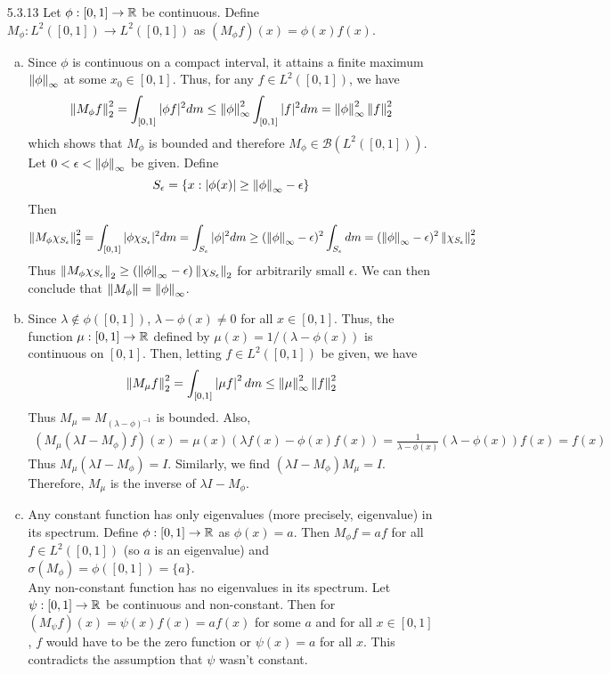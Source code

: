 \documentclass[../../Solutions.tex]{subfiles}
\begin{document}
\begin{itemize}
	\item [5.3.13] Let $\phi:[0,1]\to\mathbb{R}$ be continuous.
		Define $M_\phi:L^2([0,1])\to L^2([0,1])$ as $(M_\phi f)(x) = \phi(x)f(x)$.
		\begin{enumerate}[(a)]
			\item Since $\phi$ is continuous on a compact interval, it attains a finite maximum $\left\lVert\phi\right\rVert_\infty$ at some $x_0 \in [0,1]$.
				Thus, for any $f \in L^2([0,1])$, we have
				$$ \left\lVert M_\phi f\right\rVert_2^2 = \int_{[0,1]} |\phi f|^2 dm \leq \left\lVert\phi\right\rVert_\infty^2 \int_{[0,1]} |f|^2 dm = \left\lVert\phi\right\rVert_\infty^2 \left\lVert f\right\rVert_2^2 $$
				which shows that $M_\phi$ is bounded and therefore $M_\phi \in \mathcal{B}\left(L^2([0,1])\right)$.
				Let $0 < \epsilon < \left\lVert\phi\right\rVert_\infty$ be given.
				Define
				$$ S_\epsilon = \{x : |\phi(x)| \geq \left\lVert\phi\right\rVert_\infty-\epsilon\} $$
				Then
				$$ \left\lVert M_\phi \chi_{S_\epsilon}\right\rVert_2^2 = \int_{[0,1]} |\phi \chi_{S_\epsilon}|^2 dm = \int_{S_\epsilon} |\phi|^2 dm \geq (\left\lVert\phi\right\rVert_\infty - \epsilon)^2 \int_{S_\epsilon} dm = (\left\lVert\phi\right\rVert_\infty - \epsilon)^2 \left\lVert\chi_{S_\epsilon}\right\rVert_2^2 $$
				Thus $\left\lVert M_\phi \chi_{S_\epsilon}\right\rVert_2 \geq (\left\lVert\phi\right\rVert_\infty - \epsilon)\left\lVert\chi_{S_\epsilon}\right\rVert_2$ for arbitrarily small $\epsilon$.
				We can then conclude that $\left\lVert M_\phi\right\rVert = \left\lVert\phi\right\rVert_\infty$.
			\item Since $\lambda \not\in \phi([0,1])$, $\lambda-\phi(x) \neq 0$ for all $x \in [0,1]$.
				Thus, the function $\mu:[0,1]\to\mathbb{R}$ defined by $\mu(x) = 1/(\lambda-\phi(x))$ is continuous on $[0,1]$.
				Then, letting $f \in L^2([0,1])$ be given, we have
				\begin{align*}
					\left\lVert M_\mu f\right\rVert_2^2 = \int_{[0,1]} \left|\mu f\right|^2 dm \leq \left\lVert\mu\right\rVert_\infty^2 \left\lVert f\right\rVert_2^2
				\end{align*}
				Thus $M_\mu = M_{(\lambda-\phi)^{-1}}$ is bounded.
				Also,
				\begin{align*}
					(M_\mu (\lambda I-M_\phi) f)(x) = \mu(x) (\lambda f(x) - \phi(x) f(x)) = \frac{1}{\lambda - \phi(x)} (\lambda - \phi(x)) f(x) = f(x)
				\end{align*}
				Thus $M_\mu(\lambda I - M_\phi) = I$. Similarly, we find $(\lambda I - M_\phi)M_\mu = I$.
				Therefore, $M_\mu$ is the inverse of $\lambda I - M_\phi$.
			\item Any constant function has only eigenvalues (more precisely, eigenvalue) in its spectrum. Define $\phi:[0,1]\to\mathbb{R}$ as $\phi(x) = a$. Then $M_\phi f = af$ for all $f \in L^2([0,1])$ (so $a$ is an eigenvalue) and $\sigma(M_\phi) = \phi([0,1]) = \{a\}$. \\
				Any non-constant function has no eigenvalues in its spectrum. Let $\psi:[0,1]\to\mathbb{R}$ be continuous and non-constant. Then for $(M_\psi f)(x) = \psi(x)f(x) = af(x)$ for some $a$ and for all $x \in [0,1]$, $f$ would have to be the zero function or $\psi(x) = a$ for all $x$. This contradicts the assumption that $\psi$ wasn't constant.
		\end{enumerate}
		

\end{itemize}
\end{document}
